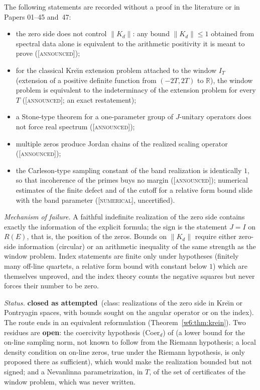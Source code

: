 \documentclass[11pt]{amsart}
\theoremstyle{definition}
\theoremstyle{remark}
\numberwithin{equation}{section}
\newcommand{\R}{\mathbb{R}}
\newcommand{\IT}{I_T}                                  %
\newcommand{\stag}[1]{\textsc{[#1]}}
\newcommand{\NUM}{\stag{numerical}}
\newcommand{\ANNOUNCED}{\stag{announced}}
\newcommand{\rtag}[1]{\textbf{\small\textsf{#1}}}
\newcommand{\closedA}{\rtag{closed as attempted}}
\newcommand{\openR}{\rtag{open}}
\newcommand{\entry}[1]{\par\smallskip\noindent\textit{#1.}\enspace}
\begin{document}
The following statements are recorded without a proof in the literature or in Papers 01--45 and~47:
\begin{itemize}[leftmargin=2em]
\item the zero side does not control $\|K_d\|$: any bound $\|K_d\|\le1$ obtained from spectral data
  alone is equivalent to the arithmetic positivity it is meant to prove (\ANNOUNCED);
\item for the classical Kre\u{\i}n extension problem attached to the window $\IT$ (extension of a
  positive definite function from $(-2T,2T)$ to $\R$), the window problem is equivalent to the
  indeterminacy of the extension problem for every $T$ (\ANNOUNCED; an exact restatement);
\item a Stone-type theorem for a one-parameter group of $J$-unitary operators does not force real
  spectrum (\ANNOUNCED);
\item multiple zeros produce Jordan chains of the realized scaling operator (\ANNOUNCED);
\item the Carleson-type sampling constant of the band realization is identically $1$, so that
  incoherence of the primes buys no margin (\ANNOUNCED); numerical estimates of the finite defect
  and of the cutoff for a relative form bound slide with the band parameter (\NUM, uncertified).
\end{itemize}

\entry{Mechanism of failure} A faithful indefinite realization of the zero side contains exactly
the information of the explicit formula; the sign is the statement $J=I$ on $R(E)$, that is, the
position of the zeros. Bounds on $\|K_d\|$ require either zero-side information (circular) or an
arithmetic inequality of the same strength as the window problem. Index statements are finite only
under hypotheses (finitely many off-line quartets, a relative form bound with constant below $1$)
which are themselves unproved, and the index theory counts the negative squares but never forces
their number to be zero.

\entry{Status} \closedA\ (class: realizations of the zero side in Kre\u{\i}n or Pontryagin spaces,
with bounds sought on the angular operator or on the index). The route ends in an equivalent
reformulation (Theorem~\ref{w6:thm:krein}). Two residues are \openR: the coercivity hypothesis
(Coer$_d$) of \cite[Theorem~1.1]{P08} (a lower bound for the on-line sampling norm, not known to follow
from the Riemann hypothesis; a local density condition on on-line zeros, true under the Riemann
hypothesis, is only proposed there as sufficient), which would make the realization bounded but not signed; and a Nevanlinna
parametrization, in $T$, of the set of certificates of the window problem, which was never
written.
\end{document}
